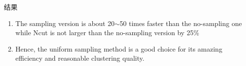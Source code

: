 \documentclass[notheorems]{beamer}
\begin{document}
\begin{CJK*}{UTF8}{gbsn}
\begin{frame}{结果}
	\begin{minipage}{0.4\linewidth}
		\scriptsize
		\begin{enumerate}
			\item The sampling version is about 20$\sim$50 times faster than the no-sampling one while Ncut is not larger than the no-sampling version by 25\%
			\item Hence, the uniform sampling method is a good choice for its amazing efficiency and reasonable clustering quality.
		\end{enumerate}
	\end{minipage}
\end{frame}
\end{CJK*}
\end{document}
